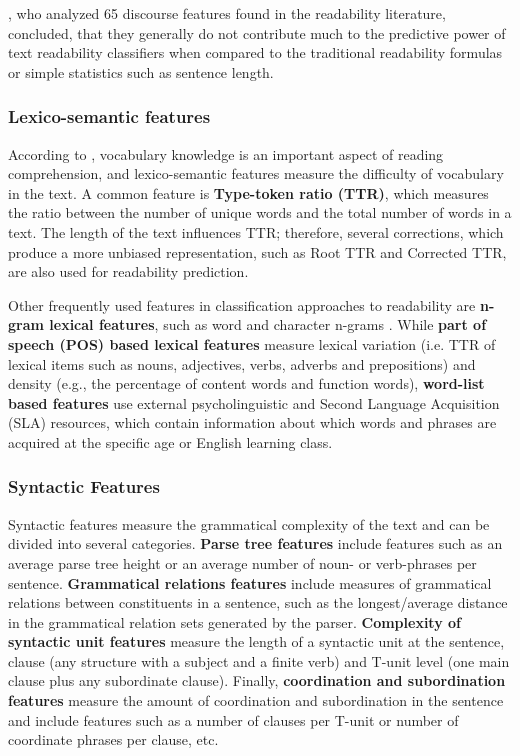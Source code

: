 \documentclass{clv3}
\begin{document}
\citet{todirascu-etal-2016-cohesive}, who analyzed 65 discourse features found in the readability literature, concluded, that they generally do not contribute much to the predictive power of text readability classifiers when compared to the traditional readability formulas or simple statistics such as sentence length. 

\subsubsection{Lexico-semantic features}

According to \citet{collins2014computational}, vocabulary knowledge is an important aspect of reading comprehension, and lexico-semantic features measure the difficulty of vocabulary in the text. A common feature is \textbf{Type-token ratio (TTR)}, which measures the ratio between the number of unique words and the total number of words in a text. The length of the text influences TTR; therefore, several corrections, which produce a more unbiased representation, such as Root TTR and Corrected TTR, are also used for readability prediction.

Other frequently used features in classification approaches to readability are \textbf{n-gram lexical features}, such as word and character n-grams \citep{vajjala2012improving, xia2016text}. While \textbf{part of speech (POS) based lexical features} measure lexical variation (i.e. TTR of lexical items such as nouns, adjectives, verbs, adverbs and prepositions) and density (e.g., the percentage of content words and function words), \textbf{word-list based features} use external psycholinguistic and Second  Language Acquisition (SLA) resources, which contain information about which words and phrases are acquired at the specific age or English learning class. 


\subsubsection{Syntactic Features}

Syntactic features measure the grammatical complexity of the text and can be divided into several categories. \textbf{Parse tree features} include features such as an average parse tree height or an average number of noun- or verb-phrases per sentence. \textbf{Grammatical relations features} include measures of grammatical relations between constituents in a sentence, such as the longest/average distance in the grammatical relation sets generated by the parser. \textbf{Complexity of syntactic unit features} measure the length of a syntactic unit at the sentence, clause (any structure with a subject and a finite verb) and T-unit level (one main clause plus any subordinate clause). Finally, \textbf{coordination and subordination features} measure the amount of coordination and subordination in the sentence and include features such as a number of clauses per T-unit or number of coordinate phrases per clause, etc.
\end{document}
